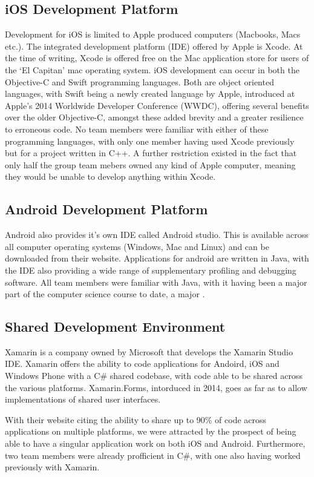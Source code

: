\documentclass[main.tex]{subfiles}
\begin{document}
\subsection*{iOS Development Platform}
Development for iOS is limited to Apple produced computers (Macbooks, Macs etc.). The integrated development platform (IDE) offered by Apple is Xcode. At the time of writing, Xcode is offered free on the Mac application store for users of the `El Capitan' mac operating system. iOS development can occur in both the Objective-C and Swift programming languages. Both are object oriented languages, with Swift being a newly created language by Apple, introduced at Apple's 2014 Worldwide Developer Conference (WWDC), offering several benefits over the older Objective-C, amongst these added brevity and a greater resilience to erroneous code. No team members were familiar with either of these programming languages, with only one member having used Xcode previously but for a project written in C++. A further restriction existed in the fact that only half the group team mebers owned any kind of Apple computer, meaning they would be unable to develop anything within Xcode.

\subsection*{Android Development Platform}

Android also provides it's own IDE called Android studio. This is available across all computer operating systems (Windows, Mac and Linux) and can be downloaded from their website. Applications for android are written in Java, with the IDE also providing a wide range of supplementary profiling and debugging software. All team members were familiar with Java, with it having been a major part of the computer science course to date, a major .

\subsection*{Shared Development Environment}

Xamarin is a company owned by Microsoft that develops the Xamarin Studio IDE. Xamarin offers the ability to code applications for Andoird, iOS and Windows Phone with a C\# shared codebase, with code able to be shared across the various platforms. Xamarin.Forms, intorduced in 2014, goes as far as to allow implementations of shared user interfaces.

With their website citing the ability to share up to 90\% of code across applications on multiple platforms, we were attracted by the prospect of being able to have a singular application work on both iOS and Android. Furthermore, two team members were already profficient in C\#, with one also having worked previously with Xamarin.
 

\nocite{*}





 
\end{document}
